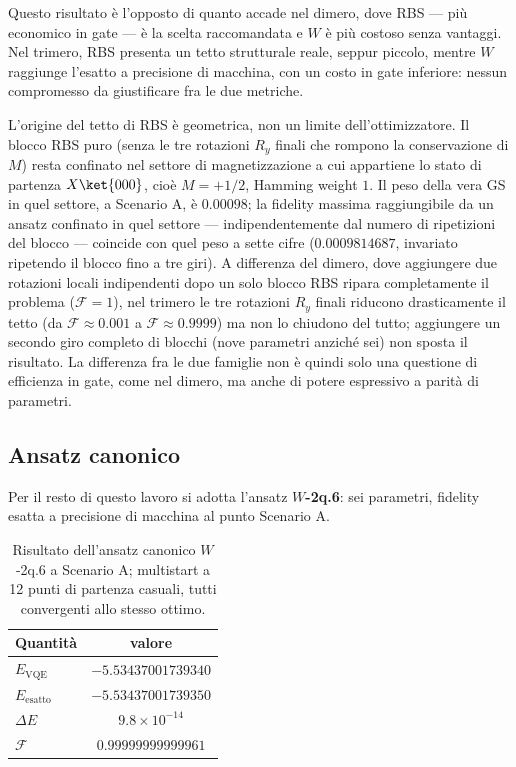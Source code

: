 \documentclass[11pt,a4paper]{article}
\begin{document}
Questo risultato è l'opposto di quanto accade nel dimero, dove RBS ---
più economico in gate --- è la scelta raccomandata e $W$ è più costoso
senza vantaggi. Nel trimero, RBS presenta un tetto strutturale reale,
seppur piccolo, mentre $W$ raggiunge l'esatto a precisione di macchina,
con un costo in gate inferiore: nessun compromesso da giustificare fra
le due metriche.

L'origine del tetto di RBS è geometrica, non un limite
dell'ottimizzatore. Il blocco RBS puro (senza le tre rotazioni $R_y$
finali che rompono la conservazione di $M$) resta confinato nel settore
di magnetizzazione a cui appartiene lo stato di partenza $X\ket{000}$,
cioè $M=+1/2$, Hamming weight $1$. Il peso della vera GS in quel settore,
a Scenario A, è $0.00098$; la fidelity massima raggiungibile da un
ansatz confinato in quel settore --- indipendentemente dal numero di
ripetizioni del blocco --- coincide con quel peso a sette cifre
($0.0009814687$, invariato ripetendo il blocco fino a tre giri). A
differenza del dimero, dove aggiungere due rotazioni locali indipendenti
dopo un solo blocco RBS ripara completamente il problema
($\mathcal F=1$), nel trimero le tre rotazioni $R_y$ finali riducono
drasticamente il tetto (da $\mathcal F\approx0.001$ a $\mathcal
F\approx0.9999$) ma non lo chiudono del tutto; aggiungere un secondo giro
completo di blocchi (nove parametri anziché sei) non sposta il risultato.
La differenza fra le due famiglie non è quindi solo una questione di
efficienza in gate, come nel dimero, ma anche di potere espressivo a
parità di parametri.

\subsection{Ansatz canonico}

Per il resto di questo lavoro si adotta l'ansatz \textbf{$W$-2q.6}: sei
parametri, fidelity esatta a precisione di macchina al punto Scenario A.

\begin{table}[htbp]
\centering
\small
\renewcommand{\arraystretch}{1.3}
\begin{tabular}{@{}lc@{}}
\toprule
\rowcolor{grigetto}
\textbf{Quantità} & \textbf{valore} \\
\midrule
$E_\text{VQE}$ & $-5.53437001739340$ \\
$E_\text{esatto}$ & $-5.53437001739350$ \\
$\Delta E$ & $9.8\times10^{-14}$ \\
$\mathcal F$ & $0.99999999999961$ \\
\bottomrule
\end{tabular}
\caption{Risultato dell'ansatz canonico $W$-2q.6 a Scenario A; multistart
a 12 punti di partenza casuali, tutti convergenti allo stesso ottimo.}
\end{table}
\FloatBarrier
\end{document}
